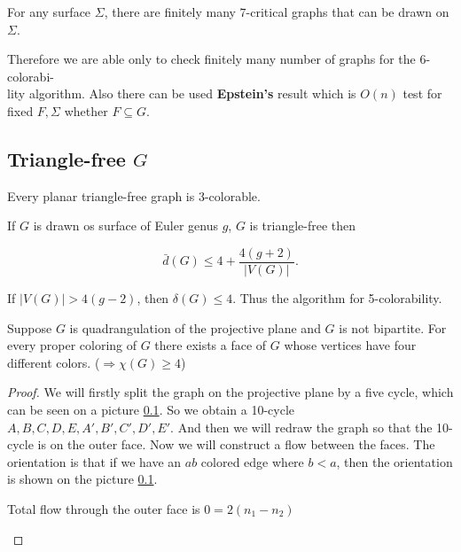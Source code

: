 \begin{cor}
	For any surface $\Sigma$, there are finitely many $7$-critical graphs that can be drawn on $\Sigma$.
\end{cor}

Therefore we are able only to check finitely many number of graphs for the 6-colorabi-\\lity algorithm. Also there can be used \textbf{Epstein's} result which is $O(n)$ test for fixed $F, \Sigma$ whether $F \subseteq G$.

\subsection{Triangle-free $G$}

\begin{thm}[Grötsch]
	Every planar triangle-free graph is 3-colorable.
	\label{thm-grotsch}
\end{thm}

\begin{lemma}
	If $G$ is drawn os surface of Euler genus $g$, $G$ is triangle-free then
	
	$$
	\bar{d}(G) \leq 4 + \frac{4 (g+2)}{|V(G)|}.
	$$
\end{lemma}

\begin{observ}
	If $|V(G)| > 4(g-2)$, then $\delta(G) \leq 4$. Thus the algorithm for 5-colorability.
\end{observ}

\begin{lemma}
	Suppose $G$ is quadrangulation of the projective plane and $G$ is not bipartite. For every proper coloring of $G$ there exists a face of $G$ whose vertices have four different colors. ($\Rightarrow \chi(G) \geq 4$)
\end{lemma}

\begin{proof}
	We will firstly split the graph on the projective plane by a five cycle, which can be seen on a picture \ref{}. So we obtain a 10-cycle $A,B,C,D,E,A',B',C',D',E'$. And then we will redraw the graph so that the 10-cycle is on the outer face. Now we will construct a flow between the faces. The orientation is that if we have an $ab$ colored edge where $b < a$, then the orientation is shown on the picture \ref{}.
	
	\begin{observ}
		Total flow through the outer face is $0 = 2 (n_1 - n_2)$
	\end{observ}
\end{proof}

